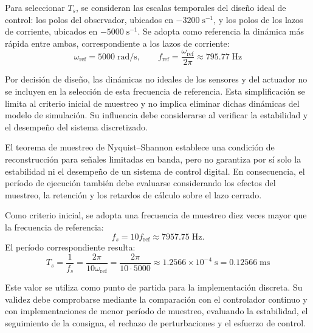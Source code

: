 \documentclass[blue,fullpaper]{ludusofficial}  %
\begin{document}
Para seleccionar $T_s$, se consideran las escalas temporales del diseño ideal de control: los polos del observador, ubicados en $-3200\;\mathrm{s^{-1}}$, y los polos de los lazos de corriente, ubicados en $-5000\;\mathrm{s^{-1}}$. Se adopta como referencia la dinámica más rápida entre ambas, correspondiente a los lazos de corriente:
\begin{equation}
    \omega_{\mathrm{ref}}=5000\;\mathrm{rad/s},
    \qquad
    f_{\mathrm{ref}}
    =\frac{\omega_{\mathrm{ref}}}{2\pi}
    \approx 795.77\;\mathrm{Hz}
\end{equation}

Por decisión de diseño, las dinámicas no ideales de los sensores y del actuador no se incluyen en la selección de esta frecuencia de referencia. Esta simplificación se limita al criterio inicial de muestreo y no implica eliminar dichas dinámicas del modelo de simulación. Su influencia debe considerarse al verificar la estabilidad y el desempeño del sistema discretizado.

El teorema de muestreo de Nyquist--Shannon establece una condición de reconstrucción para señales limitadas en banda, pero no garantiza por sí solo la estabilidad ni el desempeño de un sistema de control digital. En consecuencia, el período de ejecución también debe evaluarse considerando los efectos del muestreo, la retención y los retardos de cálculo sobre el lazo cerrado.

Como criterio inicial, se adopta una frecuencia de muestreo diez veces mayor que la frecuencia de referencia:
\begin{equation}
    f_s=10f_{\mathrm{ref}}
    \approx 7957.75\;\mathrm{Hz}.
\end{equation}
El período correspondiente resulta:
\begin{equation}
    T_s
    =\frac{1}{f_s}
    =\frac{2\pi}{10\omega_{\mathrm{ref}}}
    =\frac{2\pi}{10\cdot5000}
    \approx 1.2566\times10^{-4}\;\mathrm{s}
    =0.12566\;\mathrm{ms}
\end{equation}

Este valor se utiliza como punto de partida para la implementación discreta. Su validez debe comprobarse mediante la comparación con el controlador continuo y con implementaciones de menor período de muestreo, evaluando la estabilidad, el seguimiento de la consigna, el rechazo de perturbaciones y el esfuerzo de control.
\end{document}
